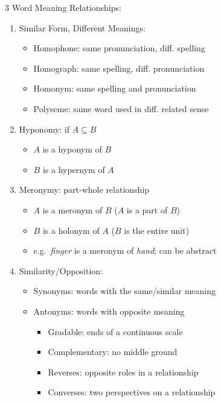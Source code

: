 \documentclass[12pt, a4paper]{article}
\begin{document}
\begin{multicols*}{3}
Word Meaning Relationships:
\begin{enumerate}[\roman*.]
  \item Similar Form, Different Meanings: 
    \begin{itemize}[leftmargin=*]\vspace{3pt}
      \item Homophone: same pronunciation, diff. spelling
      \item Homograph: same spelling, diff. pronunciation
      \item Homonym: same spelling and pronunciation 
      \item Polyseme: same word used in diff. related sense
    \end{itemize}
  \item Hyponomy: if $A \subseteq B$
    \begin{itemize}[leftmargin=*]\vspace{3pt}
      \item $A$ is a hyponym of $B$
      \item $B$ is a hypernym of $A$
    \end{itemize}
  \item Meronymy: part-whole relationship
    \begin{itemize}[leftmargin=*]\vspace{3pt}
      \item $A$ is a meronym of $B$ ($A$ is a part of $B$)
      \item $B$ is a holonym of $A$ ($B$ is the entire unit)
      \item e.g.\ \textit{finger} is a meronym of \textit{hand}; can be abstract 
    \end{itemize}
  \item Similarity/Opposition:
    \begin{itemize}[leftmargin=*]\vspace{3pt}
      \item Synonyms: words with the same/similar meaning
      \item Antonyms: words with opposite meaning
      \begin{itemize}[leftmargin=*]\vspace{5pt}
        \item Gradable: ends of a continuous scale 
        \item Complementary: no middle ground
        \item Reverses: opposite roles in a relationship
        \item Converses: two perspectives on a relationship
      \end{itemize}
    \end{itemize}
\end{enumerate}



\end{multicols*}
\end{document}
